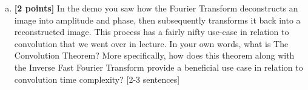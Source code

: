 \documentclass[11pt]{article}
\begin{document}
\begin{enumerate}[(a)]

\newpage

\item \textbf{[2 points]} In the demo you saw how the Fourier Transform deconstructs an image into amplitude and phase, then subsequently transforms it back into a reconstructed image. This process has a fairly nifty use-case in relation to convolution that we went over in lecture. In your own words, what is The Convolution Theorem? More specifically, how does this theorem along with the Inverse Fast Fourier Transform provide a beneficial use case in relation to convolution time complexity? [2-3 sentences]



\end{enumerate}
\end{document}
